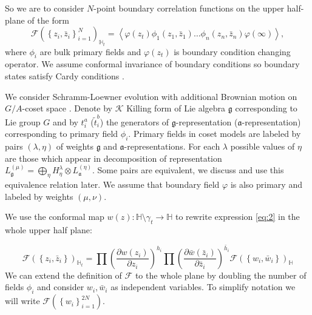 \documentclass[a4paper]{article}
\theoremstyle{definition}
\newcommand{\gf}{\mathfrak{g}}
\newcommand{\af}{\mathfrak{a}}
\theoremstyle{definition} \newtheorem{Def}{Definition}
\begin{document}
So we are to consider $N$-point boundary correlation functions on the upper half-plane of the form 
\begin{equation}
  \mathcal{F}(\left\{z_{i},\bar z_{i}\right\}_{i=1}^{N})_{\mathbb{H}_{t}}=
\left<\varphi(z_{t}) \phi_{1}(z_{1},\bar z_{1}) \dots \phi_{n}(z_{n},\bar z_{n})
      \varphi(\infty)\right>,
    \label{eq:2}
\end{equation}
where $\phi_{i}$ are bulk primary fields and $\varphi(z_{t})$ is boundary condition changing operator. We assume conformal invariance of boundary conditions so boundary states satisfy Cardy conditions \cite{cardy1989boundary,cardy1986effect,cardy1984conformal}. 

 We consider Schramm-Loewner evolution with additional Brownian motion on $G/A$-coset space \cite{2011arXiv1112.4354N}. Denote by $\mathcal{K}$ Killing form of Lie algebra $\gf$ corresponding to Lie group $G$ and by $t^{a}_{i}$ ($\tilde{t}^{b}_{i}$) the  generators of $\gf$-representation ($\af$-representation) corresponding to primary field $\phi_{i}$.
Primary fields in coset models are labeled by pairs $(\lambda,\eta)$ of weights $\gf$ and $\af$-representations. For each $\lambda$ possible values of $\eta$ are those which appear in decomposition of representation $L^{(\mu)}_{\gf}=\bigoplus_{\eta} H^{\lambda}_{\eta}\otimes L^{(\eta)}_{\af}$. Some pairs are equivalent, we discuss and use this equivalence relation later. 
We assume that boundary field $\varphi$ is also primary and labeled by weights $(\mu,\nu)$.

  We use the conformal map  $w(z):\mathbb{H}\setminus\gamma_{t}\to \mathbb{H}$ to rewrite expression \eqref{eq:2} in the whole upper half plane:

\begin{equation}
  \mathcal{F}(\left\{z_{i},\bar z_{i}\right\})_{\mathbb{H}_{t}}=\prod \left(\frac{\partial w(z_{i})}{\partial z_{i}}\right)^{h_{i}} 
  \prod \left(\frac{\partial \bar w(\bar z_{i})}{\partial \bar z_{i}}\right)^{\bar h_i}
  \mathcal{F}(\left\{w_{i}, \bar w_{i}\right\})_{\mathbb{H}}
  \label{eq:1}
\end{equation}
We can extend the definition of $\mathcal{F}$ to the whole plane by doubling the number of fields $\phi_{i}$ \cite{cardy2004boundary,cardy1984conformal} and consider $w_{i},\bar w_{i}$ as independent variables. To simplify notation we will write $\mathcal{F}(\left\{w_{i}\right\}_{i=1}^{2N})$.
\end{document}
